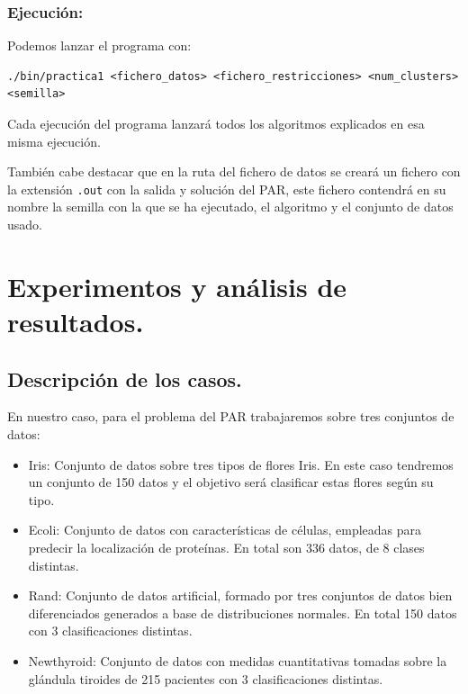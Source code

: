 \documentclass[12pt, spanish]{article}
\begin{document}
\subsubsection{Ejecución:}

Podemos lanzar el programa con:

\begin{lstlisting}
./bin/practica1 <fichero_datos> <fichero_restricciones> <num_clusters> <semilla>
\end{lstlisting}

Cada ejecución del programa lanzará todos los algoritmos explicados en esa misma ejecución.

También cabe destacar que en la ruta del fichero de datos se creará un fichero con la extensión \texttt{.out} con la salida y solución del PAR, este fichero contendrá en su nombre la semilla con la que se ha ejecutado, el algoritmo y el conjunto de datos usado.


\newpage

\section{Experimentos y análisis de resultados.}


\subsection{Descripción de los casos.}

En nuestro caso, para el problema del PAR trabajaremos sobre tres conjuntos de datos:

\begin{itemize}
	\item{Iris: Conjunto de datos sobre tres tipos de flores Iris. En este caso tendremos un conjunto de 150 datos y el objetivo será clasificar estas flores según su tipo.}
	\item{Ecoli: Conjunto de datos con características de células, empleadas para predecir la localización de proteínas. En total son 336 datos, de 8 clases distintas.}
	\item{Rand: Conjunto de datos artificial, formado por tres conjuntos de datos bien diferenciados generados a base de distribuciones normales. En total 150 datos con 3 clasificaciones distintas.}
	\item{Newthyroid: Conjunto de datos con medidas cuantitativas tomadas sobre la glándula tiroides de 215 pacientes con 3 clasificaciones distintas.} 
\end{itemize}
\end{document}

